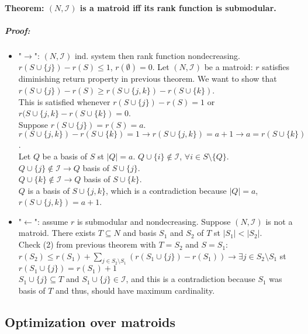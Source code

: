 \documentclass[main]{subfiles}
\begin{document}
\paragraph{Theorem: $(N,\mathcal{I})$ is a matroid iff its rank function is
submodular.}
\subparagraph{Proof:}
\begin{itemize}
\item "$\rightarrow$": $(N,\mathcal{I})$ ind. system then rank function 
nondecreasing.
\subitem $r(S \cup \{j\}) - r(S) \leq 1$, $r(\emptyset) = 0$. Let
$(N,\mathcal{I})$ be a matroid: $r$ satisfies diminishing return property in
previous theorem. We want to show that $r(S \cup \{j\}) - r(S) \geq  r(S \cup
\{j,k\}) - r(S \cup \{k\})$.\\
This is satisfied whenever $r(S \cup \{j\}) - r(S) = 1$ or $r(S \cup \{j,k\}
- r(S \cup \{k\}) = 0$.\\
Suppose $r(S \cup \{j\}) = r(S) = a$. $r(S \cup \{j,k\}) - r(S \cup \{k\}) = 1
\rightarrow r(S \cup \{j,k\}) = a+ 1 \rightarrow a = r(S \cup \{k\})$.\\
Let $Q$ be a basis of $S$ st $|Q| = a$. $Q \cup \{i\} \notin \mathcal{I}$,
$\forall i \in S\setminus \{Q\}$.\\
$Q \cup \{j\} \notin \mathcal{I} \rightarrow Q$ basis of $S \cup \{j\}$.\\
$Q \cup \{k\} \notin \mathcal{I} \rightarrow Q$ basis of $S \cup \{k\}$.\\
$Q$ is a basis of $S \cup \{j,k\}$, which is a contradiction because $|Q| = a$,
$r(S \cup \{j,k\}) = a+1$.
\item "$\leftarrow$": assume $r$ is submodular and nondecreasing.
\subitem Suppose $(N,\mathcal{I})$ is not a matroid. There exists $T \subseteq
N$ and basis $S_1$ and $S_2$ of $T$ st $|S_1| < |S_2|$.\\
Check (2) from previous theorem with $T = S_2$ and $S = S_1$:\\
$r(S_2) \leq r(S_1) + \sum_{j \in S_2 \setminus S_1}( r(S_1 \cup \{j\}) -
r(S_1)) \rightarrow \exists j \in S_2 \setminus S_1$ st $r(S_1 \cup \{j\}) =
r(S_1) + 1$\\
$S_1 \cup \{j\} \subseteq T$ and $S_1 \cup \{j\} \in \mathcal{I}$, and this is
a contradiction because $S_1$ was basis of $T$ and thus, should have maximum
cardinality.
\end{itemize}

\subsection{Optimization over matroids}
\end{document}
